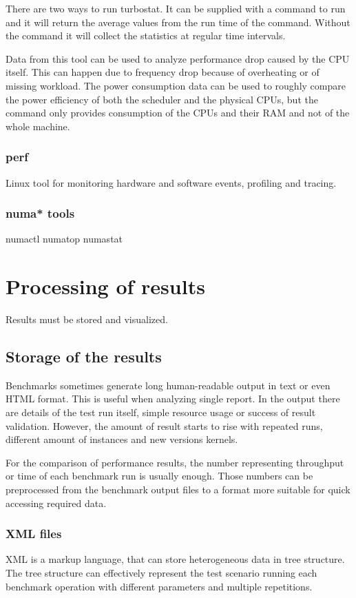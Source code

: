 There are two ways to run turbostat. It can be supplied with a command to run
and it will return the average values from the run time of the command. Without
the command it will collect the statistics at regular time intervals.

Data from this tool can be used to analyze performance drop caused by the CPU
itself. This can happen due to frequency drop because of overheating or of
missing workload. The power consumption data can be used to roughly compare the
power efficiency of both the scheduler and the physical CPUs, but the command
only provides consumption of the CPUs and their RAM and not of the whole
machine.

\subsection{perf}
Linux tool for monitoring hardware and software events, profiling and tracing.

\subsection{numa* tools}
numactl
numatop
numastat



\chapter{Processing of results} \label{ch:processing}
Results must be stored and visualized.

\section{Storage of the results}
Benchmarks sometimes generate long human-readable output in text or even HTML
format. This is useful when analyzing single report. In the output there are details
of the test run itself, simple resource usage or success of result validation.
However, the amount of result starts to rise with repeated runs, different
amount of instances and new versions kernels.

For the comparison of performance results, the number representing throughput or
time of each benchmark run is usually enough. Those numbers can be preprocessed
from the benchmark output files to a format more suitable for quick accessing
required data.

\subsection{XML files}
XML is a markup language, that can store heterogeneous data in tree structure.
The tree structure can effectively represent the test scenario running each
benchmark operation with different parameters and multiple repetitions.

